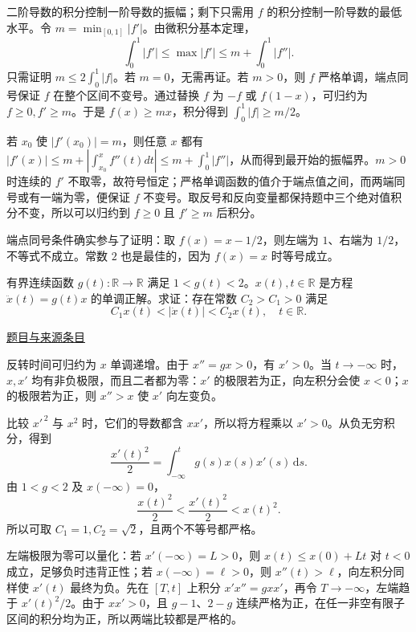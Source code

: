 \documentclass[12pt,fontset=fandol]{ctexart}
\begin{document}
\begin{solve}\label{ans:fin09-hi:7}

二阶导数的积分控制一阶导数的振幅；剩下只需用 $f$ 的积分控制一阶导数的最低水平。令 $m=\min_{[0,1]}|f'|$。由微积分基本定理，
\[
\int_0^1|f'|\leq\max|f'|\leq m+\int_0^1|f''|.
\]
只需证明 $m\leq2\int_0^1|f|$。若 $m=0$，无需再证。若 $m>0$，则 $f$ 严格单调，端点同号保证 $f$ 在整个区间不变号。通过替换 $f$ 为 $-f$ 或 $f(1-x)$，可归约为 $f\geq0,f'\geq m$。于是 $f(x)\geq mx$，积分得到 $\int_0^1|f|\geq m/2$。

若 $x_0$ 使 $|f'(x_0)|=m$，则任意 $x$ 都有 $|f'(x)|\le m+|\int_{x_0}^xf''(t)dt|\le m+\int_0^1|f''|$，从而得到最开始的振幅界。$m>0$ 时连续的 $f'$ 不取零，故符号恒定；严格单调函数的值介于端点值之间，而两端同号或有一端为零，便保证 $f$ 不变号。取反号和反向变量都保持题中三个绝对值积分不变，所以可以归约到 $f\ge0$ 且 $f'\ge m$ 后积分。

\end{solve}

\begin{remark}[方法与条件]端点同号条件确实参与了证明：取 $f(x)=x-1/2$，则左端为 $1$、右端为 $1/2$，不等式不成立。常数 $2$ 也是最佳的，因为 $f(x)=x$ 时等号成立。\end{remark}

\begin{example}\label{ex:fin09-lo:9}\label{pr:fin09-lo:9}

有界连续函数 $g(t): \mathbb{R} \rightarrow \mathbb{R}$ 满足 $1 < g(t) < 2$。$x(t), t \in \mathbb{R}$ 是方程 $\ddot{x}(t) = g(t)x$ 的单调正解。求证：存在常数 $C_2 > C_1 > 0$ 满足
\[
C_1 x(t) < |\dot{x}(t)| < C_2 x(t), \quad t \in \mathbb{R}.
\]

\par\href{https://github.com/lzxcr/cmc-mathematics/blob/64916fa1fdbc3e444a652eca204d5669058ee321/src/problems/finals/09/10.md}{题目与来源条目}

\end{example}

\begin{solve}\label{ans:fin09-lo:9}

反转时间可归约为 $x$ 单调递增。由于 $x''=gx>0$，有 $x'>0$。当 $t\to-\infty$ 时，$x,x'$ 均有非负极限，而且二者都为零：$x'$ 的极限若为正，向左积分会使 $x<0$；$x$ 的极限若为正，则 $x''>x$ 使 $x'$ 向左变负。

比较 $x'^{\,2}$ 与 $x^2$ 时，它们的导数都含 $xx'$，所以将方程乘以 $x'>0$。从负无穷积分，得到
\[
\frac{x'(t)^2}{2}=\int_{-\infty}^tg(s)x(s)x'(s)\,\mathrm ds.
\]
由 $1<g<2$ 及 $x(-\infty)=0$，
\[
\frac{x(t)^2}{2}<\frac{x'(t)^2}{2}<x(t)^2.
\]
所以可取 $C_1=1,C_2=\sqrt2$，且两个不等号都严格。

左端极限为零可以量化：若 $x'(-\infty)=L>0$，则 $x(t)\le x(0)+Lt$ 对 $t<0$ 成立，足够负时违背正性；若 $x(-\infty)=\ell>0$，则 $x''(t)>\ell$，向左积分同样使 $x'(t)$ 最终为负。先在 $[T,t]$ 上积分 $x'x''=gxx'$，再令 $T\to-\infty$，左端趋于 $x'(t)^2/2$。由于 $xx'>0$，且 $g-1$、$2-g$ 连续严格为正，在任一非空有限子区间的积分均为正，所以两端比较都是严格的。

\end{solve}
\end{document}
